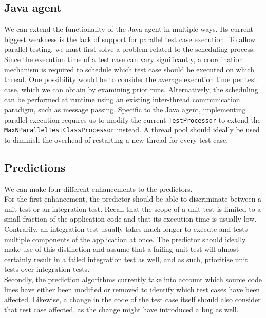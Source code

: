\subsection{Java agent}
We can extend the functionality of the Java agent in multiple ways. Its current biggest weakness is the lack of support for parallel test case execution. To allow parallel testing, we must first solve a problem related to the scheduling process. Since the execution time of a test case can vary significantly, a coordination mechanism is required to schedule which test case should be executed on which thread. One possibility would be to consider the average execution time per test case, which we can obtain by examining prior runs. Alternatively, the scheduling can be performed at runtime using an existing inter-thread communication paradigm, such as message passing. Specific to the Java agent, implementing parallel execution requires us to modify the current \texttt{TestProcessor} to extend the \texttt{MaxNParallelTestClassProcessor} instead. A thread pool should ideally be used to diminish the overhead of restarting a new thread for every test case.

\subsection{Predictions}
We can make four different enhancements to the predictors.\\

\noindent For the first enhancement, the predictor should be able to discriminate between a unit test or an integration test. Recall that the scope of a unit test is limited to a small fraction of the application code and that its execution time is usually low. Contrarily, an integration test usually takes much longer to execute and tests multiple components of the application at once. The predictor should ideally make use of this distinction and assume that a failing unit test will almost certainly result in a failed integration test as well, and as such, prioritise unit tests over integration tests.\\

\noindent Secondly, the prediction algorithms currently take into account which source code lines have either been modified or removed to identify which test cases have been affected. Likewise, a change in the code of the test case itself should also consider that test case affected, as the change might have introduced a bug as well.\\

